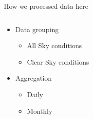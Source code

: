 \documentclass[
  ignorenonframetext,
]{beamer}
\providecommand{\tightlist}{%
  \setlength{\itemsep}{0pt}\setlength{\parskip}{0pt}}\usepackage{longtable,booktabs,array}
\begin{document}
\begin{frame}[fragile]
\begin{block}{How we processed data here}
\begin{columns}[T]
\begin{column}{0.5\textwidth}
\begin{itemize}
\tightlist
\item
  Data grouping

  \begin{itemize}
  \tightlist
  \item
    All Sky conditions
  \item
    Clear Sky conditions
  \end{itemize}
\item
  Aggregation

  \begin{itemize}
  \tightlist
  \item
    Daily
  \item
    Monthly
  \end{itemize}
\end{itemize}
\end{column}
\end{columns}

~ ~

\end{block}
\end{frame}
\end{document}
